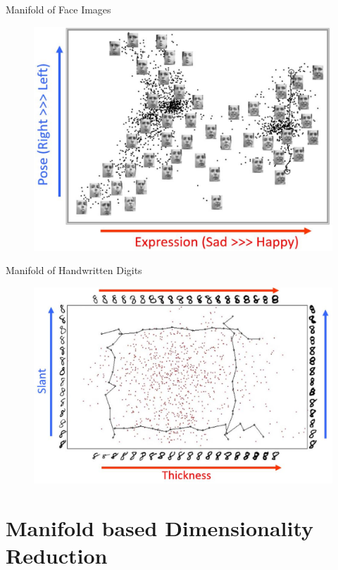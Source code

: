 \documentclass{beamer}
\begin{document}
\begin{darkframes}
	\begin{frame}{Manifold of Face Images}
	\begin{figure}
	\centering
	\includegraphics[scale=0.28]{./figs/fig4.eps}
	\end{figure}
	
	\end{frame}
	
	\begin{frame}{Manifold of Handwritten Digits}
	\begin{figure}
	\centering
	\includegraphics[scale=0.26]{./figs/fig5.eps}
	\end{figure}
	
	\end{frame}	
	
    \section{Manifold based Dimensionality Reduction}

\end{darkframes}
\end{document}
